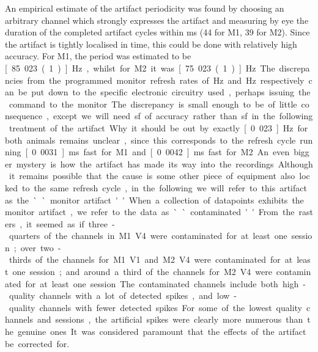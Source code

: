 An empirical estimate of the artifact periodicity was found by choosing an arbitrary channel which strongly expresses the artifact and measuring by eye the duration of the completed artifact cycles within \unit[530]{ms} (44 for M1, 39 for M2). Since the artifact is tightly localised in time, this could be done with relatively high accuracy. For M1, the period was estimated to be \unit[85.023(1)]{Hz}, whilst for M2 it was \unit[75.023(1)]{Hz}. The discrepancies from the programmed monitor refresh rates of \unit[85]{Hz} and \unit[75]{Hz} respectively can be put down to the specific electronic circuitry used, perhaps issuing the command to the monitor. The discrepancy is small enough to be of little consequence, except we will need \unit[5]{sf} of accuracy rather than \unit[2]{sf} in the following treatment of the artifact. Why it should be out by exactly \unit[0.023]{Hz} for both animals remains unclear, since this corresponds to the refresh cycle running \unit[0.0031]{ms} fast for M1 and \unit[0.0042]{ms} fast for M2. An even bigger mystery is how the artifact has made its way into the recordings. Although it remains possible that the cause is some other piece of equipment also locked to the same refresh cycle, in the following we will refer to this artifact as the ``monitor artifact''. When a collection of datapoints exhibits the monitor artifact, we refer to the data as ``contaminated''.

From the rasters, it seemed as if three-quarters of the channels in M1 V4 were contaminated for at least one session; over two-thirds of the channels for M1 V1 and M2 V4 were contaminated for at least one session; and around a third of the channels for M2 V4 were contaminated for at least one session. The contaminated channels include both high-quality channels with a lot of detected spikes, and low-quality channels with fewer detected spikes. For some of the lowest quality channels and sessions, the artificial spikes were clearly more numerous than the genuine ones. It was considered paramount that the effects of the artifact be corrected for.

